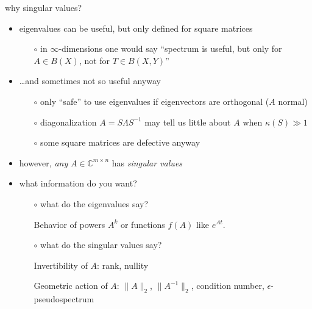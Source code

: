 \documentclass[10pt,hyperref]{beamer}
\newcommand{\CC}{\mathbb{C}}
\newcommand{\eps}{\epsilon}
\begin{document}
\begin{frame}{why singular values?}

\begin{itemize}
\item eigenvalues can be useful, but only defined for square matrices
    \begin{itemize}
    \item[$\circ$] in $\infty$-dimensions one would say ``spectrum is useful, but only for $A\in B(X)$, not for $T \in B(X,Y)$''
    \end{itemize}
\item \dots and sometimes not so useful anyway
    \begin{itemize}
    \item[$\circ$] only ``safe'' to use eigenvalues if eigenvectors are orthogonal ($A$ normal)
    \item[$\circ$] diagonalization $A=S\Lambda S^{-1}$ may tell us little about $A$ when $\kappa(S)\gg 1$
    \item[$\circ$] some square matrices are defective anyway
    \end{itemize}
\item however, \emph{any} $A \in \CC^{m\times n}$ has \emph{singular values}
\item what information do you want?
    \begin{itemize}

\medskip
    \item[$\circ$] what do the \alert{eigenvalues} say?

\medskip
    Behavior of powers $A^k$ or functions $f(A)$ like $e^{At}$.

\medskip
    \item[$\circ$] what do the \alert{singular values} say?

\medskip
Invertibility of $A$: rank, nullity

\medskip
Geometric action of $A$: $\|A\|_2$, $\|A^{-1}\|_2$, condition number, $\eps$-pseudospectrum
    \end{itemize}
\end{itemize}
\end{frame}
\end{document}
